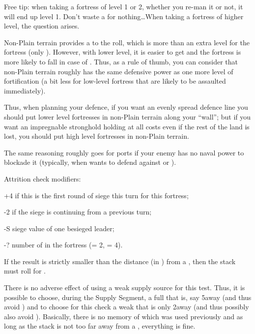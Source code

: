 \begin{playtip}
  Free tip: when taking a fortress of level 1 or 2, whether you re-man it or
  not, it will end up level 1. Don't waste a \LD for nothing\ldots When taking
  a fortress of higher level, the question arises.
\end{playtip}

\begin{playtip}
  Non-Plain terrain provides a  to the roll, which is more than an
  extra level for the fortress (only ). However, with lower level,
  it is easier to get  and the fortress is more likely
  to fall in case of . Thus, as a rule of thumb, you can
  consider that non-Plain terrain roughly has the same defensive power as one
  more level of fortification (a bit less for low-level fortress that are
  likely to be assaulted immediately).

  Thus, when planning your defence, if you want an evenly spread defence line
  you should put lower level fortresses in non-Plain terrain along your
  ``wall''; but if you want an impregnable stronghold holding at all costs
  even if the rest of the land is lost, you should put high level fortresses
  in non-Plain terrain.

  The same reasoning roughly goes for ports if your enemy has no naval power
  to blockade it (typically, when \SUE wants to defend against \RUS or \POL).
\end{playtip}

Attrition check modifiers:
\begin{modlist}
\item[+4] if this is the first round of siege this turn for this fortress;
\item[-2] if the siege is continuing from a previous turn;
\item[-S] siege value of one besieged leader;
\item[-?] number of \LD in the fortress (\ARMY\facemoins = 2\LD,
  \ARMY\faceplus = 4\LD).
\end{modlist}

If the result is strictly smaller than the distance (in \MP) from a \SoS, then
the stack must roll for .

There is no adverse effect of using a weak supply source for this test. Thus,
it is possible to choose, during the Supply Segment, a full \SoS that is, say
5\MP away (and thus avoid ) and to choose for this
check a weak \SoS that is only 2\MP away (and thus possibly also avoid
). Basically, there is no memory of which \SoS was used
previously and as long as the stack is not too far away from a \SoS,
everything is fine.

